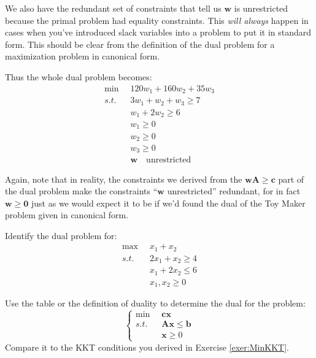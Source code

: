\begin{example}
We also have the redundant set of constraints that tell us $\mathbf{w}$ is unrestricted because the primal problem had equality constraints. This \textit{will always} happen in cases when  you've introduced slack variables into a problem to put it in standard form. This should be clear from the definition of the dual problem for a maximization problem in canonical form. 

Thus the whole dual problem becomes:
\begin{equation}
\begin{aligned}
\min\;\;&120w_1 + 160w_2 + 35w_3\\
s.t.\;\; & 3w_1 + w_2 + w_3 \geq 7\\
&w_1 + 2w_2 \geq 6\\
&w_1 \geq 0\\
&w_2 \geq 0\\
&w_3 \geq 0 \\
&\mathbf{w}\quad\text{unrestricted}
\end{aligned}
\end{equation}

Again, note that in reality, the constraints we derived from the $\mathbf{w}\mathbf{A}\geq\mathbf{c}$ part of the dual problem make the constraints ``$\mathbf{w}$ unrestricted'' redundant, for in fact $\mathbf{w} \geq \mathbf{0}$ just as we would expect it to be if we'd found the dual of the Toy Maker problem given in canonical form.
\end{example}


\begin{exercise} Identify the dual problem for:
\begin{displaymath}
\begin{aligned}
\max\;\;&x_1 + x_2\\
s.t.\;\;&2x_1 + x_2 \geq 4\\
&x_1 + 2x_2 \leq 6\\
&x_1, x_2 \geq 0
\end{aligned}
\end{displaymath}
\end{exercise}

\begin{exercise} Use the table or the definition of duality to determine the dual for the problem:
\begin{equation}
\left\{
\begin{aligned}
\min\;\; & \mathbf{c}\mathbf{x}\\
s.t.\;\; & \mathbf{A}\mathbf{x} \leq \mathbf{b}\\
& \mathbf{x} \geq 0
\end{aligned}\right.
\end{equation}
Compare it to the KKT conditions you derived in Exercise \ref{exer:MinKKT}.
\end{exercise}

